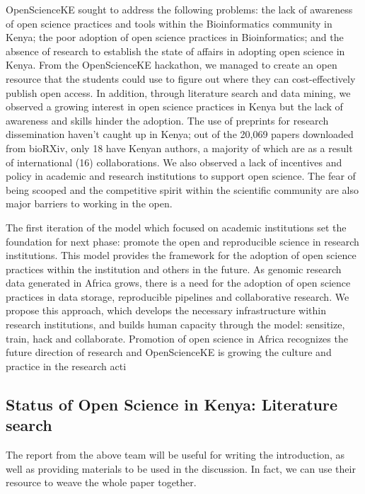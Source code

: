 OpenScienceKE sought to address the following problems: the lack of
awareness of open science practices and tools within the Bioinformatics
community in Kenya; the poor adoption of open science practices in
Bioinformatics; and the absence of research to establish the state of
affairs in adopting open science in Kenya. From the OpenScienceKE
hackathon, we managed to create an open resource that the students could
use to figure out where they can cost-effectively publish open access.
In addition, through literature search and data mining, we observed a
growing interest in open science practices in Kenya but the lack of
awareness and skills hinder the adoption. The use of preprints for
research dissemination haven't caught up in Kenya; out of the 20,069
papers downloaded from bioRXiv, only 18 have Kenyan authors, a majority
of which are as a result of international (16) collaborations. We also
observed a lack of incentives and policy in academic and research
institutions to support open science. The fear of being scooped and the
competitive spirit within the scientific community are also major
barriers to working in the open.

The first iteration of the model which focused on academic institutions
set the foundation for next phase: promote the open and reproducible
science in research institutions. This model provides the framework for
the adoption of open science practices within the institution and others
in the future. As genomic research data generated in Africa grows, there
is a need for the adoption of open science practices in data storage,
reproducible pipelines and collaborative research. We propose this
approach, which develops the necessary infrastructure within research
institutions, and builds human capacity through the model: sensitize,
train, hack and collaborate. Promotion of open science in Africa
recognizes the future direction of research and OpenScienceKE is growing
the culture and practice in the research acti

\subsection*{Status of Open Science in Kenya: Literature
search}\label{status-of-open-science-in-kenya-literature-search}

The report from the above team will be useful for writing the
introduction, as well as providing materials to be used in the
discussion. In fact, we can use their resource to weave the whole paper
together.

